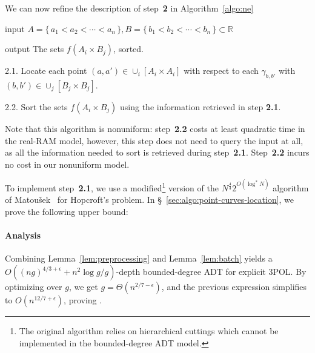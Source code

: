 We can now refine the description of step~\textbf{2} in Algorithm~\ref{algo:ne}
\begin{algorithm}\label{algo:sfaixbj}
\item[input] $A = \{\,a_1<a_2<\cdots<a_n\,\},B = \{\,b_1<b_2<\cdots<b_n\,\}
    \subset \mathbb{R}$
\item[output] The sets $f(A_i \times B_j)$, sorted.
\item[2.1.] Locate each point $(a,a') \in \cup_i [A_i \times A_i]$
    with respect to
    each $\gamma_{b,b'}$ with $(b,b') \in \cup_j [B_j \times B_j]$.
\item[2.2.] Sort the sets $f(A_i \times B_j)$ using the
    information retrieved in step \textbf{2.1}.
\end{algorithm}
Note that this algorithm is nonuniform: step~\textbf{2.2} costs at least
quadratic time in the real-RAM model, however, this step does not need to
query the input at all, as all the information needed to sort is retrieved during
step~\textbf{2.1}.
Step~\textbf{2.2} incurs no cost in
our nonuniform model.

To implement step~\textbf{2.1}, we use a modified\footnote{The original
algorithm relies on hierarchical cuttings which cannot be
implemented in the bounded-degree ADT model.}
version of the $N^{\frac 43} 2^{O(\log^* N)}$ algorithm of
Matou\v{s}ek~\cite{Ma93} for Hopcroft's problem.
In \S~\ref{sec:algo:point-curves-location}, we prove the following upper bound:
%



\paragraph{Analysis}
Combining Lemma~\ref{lem:preprocessing} and Lemma~\ref{lem:batch} yields a $O(
{(ng)}^{4/3+\epsilon} + n^2 \log g / g)$-depth bounded-degree ADT for
explicit 3POL\@. By optimizing over $g$, we get $g = \Theta(n^{2/7-\epsilon})$, and
the previous expression simplifies to $O(n^{12/7+\epsilon})$, proving
.
